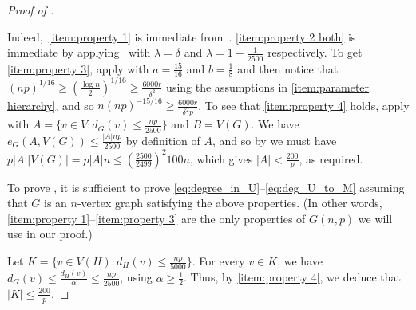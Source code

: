 \documentclass[10pt,a4paper,reqno]{amsart}
\begin{document}
\begin{proof}[Proof of ]
\begin{enumerate}[leftmargin=*,label = {\bfseries P\arabic{enumi}}]
\end{enumerate}
Indeed,~\ref{item:property 1} is immediate from~. \ref{item:property 2 both} is immediate by applying~ with $\lambda = \delta$ and $\lambda = 1 - \tfrac{1}{2500}$ respectively. 
To get \ref{item:property 3}, apply  with $a=\frac{15}{16}$ and $b=\frac{1}{8}$ and then notice that $(np)^{1/16} \ge (\frac{\log{n}}{2})^{1/16} \ge \frac{6000r}{\delta^2}$ using the assumptions in \ref{item:parameter hierarchy}, and so $n(np)^{-15/16} \ge \frac{6000r}{\delta^2 p}$. To see that \ref{item:property 4} holds, apply  with $A = \{v \in V: d_G(v) \le \frac{np}{2500}\}$ and $B = V(G)$. We have $e_G(A,V(G)) \le \frac{|A|np}{2500}$ by definition of $A$, and so by  we must have $p|A||V(G)| = p|A|n \le \left(\frac{2500}{2499}\right)^2 100n$, which gives $|A| < \frac{200}{p}$, as required.

To prove , it is sufficient to prove \ref{eq:degree_in_U}--\ref{eq:deg_U_to_M} assuming that $G$ is an $n$-vertex graph satisfying the above properties. (In other words, \ref{item:property 1}--\ref{item:property 3} are the only properties of $G(n,p)$ we will use in our proof.)

Let $K =\{v \in V(H): d_H(v) \le \frac{np}{5000}\}$. For every $v\in K$, we have $d_G(v)\le \frac{d_H(v)}{\alpha}\le \frac{np}{2500}$, using $\alpha \ge \frac{1}{2}$. Thus, by \ref{item:property 4}, we deduce that $|K|\le \frac{200}{p}$. 


\end{proof}
\end{document}
